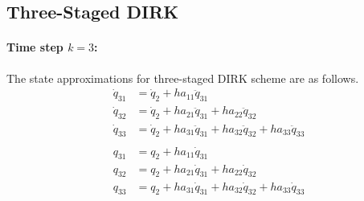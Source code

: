 \documentclass[10pt,letter]{book}
\begin{document}
     \subsection{Three-Staged DIRK}
     \paragraph{Time step $k=3$:}
     The state approximations for three-staged DIRK scheme are as follows.
     \begin{equation}\nonumber
       \begin{split}
         \dot{q}_{31} &= \dot{q}_2 + h a_{11} \ddot{q}_{31} \\
         \dot{q}_{32} &= \dot{q}_2 + h a_{21} \ddot{q}_{31} + h a_{22} \ddot{q}_{32} \\
         \dot{q}_{33} &= \dot{q}_2 + h a_{31} \ddot{q}_{31} + h a_{32} \ddot{q}_{32} + h a_{33} \ddot{q}_{33} \\
         \\
         q_{31} &= q_2 + h a_{11} \dot{q}_{31} \\
         q_{32} &= q_2 + h a_{21} \dot{q}_{31} + h a_{22} \dot{q}_{32} \\
         q_{33} &= q_2 + h a_{31} \dot{q}_{31} + h a_{32} \dot{q}_{32}+ h a_{33} \dot{q}_{33}  \\
       \end{split}
     \end{equation}
     
\end{document}

